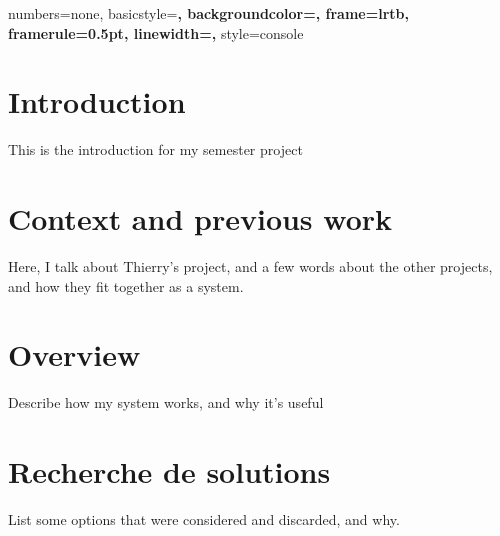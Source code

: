 
\newpage{}

\fancyfoot{}
\lhead{}
\cfoot{\thepage}        %
\rfoot{\today} %



\tableofcontents{}

\newpage

\lstset{language=C}


{
  numbers=none,
  basicstyle=\bf\ttfamily,
  backgroundcolor=\color{grey92},
  frame=lrtb,
  framerule=0.5pt,
  linewidth=\textwidth,
}
{
  style=console
}

\lstset{
  style=console
}



\section*{Introduction}
This is the introduction for my semester project

\section{Context and previous work}
Here, I talk about Thierry's project, and a few words about the other projects,
and how they fit together as a system.

\section{Overview}
Describe how my system works, and why it's useful

\section{Recherche de solutions}
List some options that were considered and discarded, and why.

